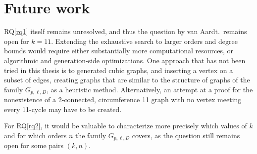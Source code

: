 \section{Future work}
RQ\ref{rq1} itself remains unresolved, and thus the question by van Aardt.\ remains open for $k=11$. Extending the exhaustive search to larger orders and degree bounds would require either substantially more computational resources, or algorithmic and generation-side optimizations. One approach that has not been tried in this thesis is to generated cubic graphs, and inserting a vertex on a subset of edges, creating graphs that are similar to the structure of graphs of the family $G_{p,\ell,D}$, as a heuristic method. Alternatively, an attempt at a proof for the nonexistence of a 2-connected, circumference 11 graph with no vertex meeting every 11-cycle may have to be created.

For RQ\ref{rq2}, it would be valuable to characterize more precisely which values of $k$ and for which orders $n$ the family $G_{p,\ell,D}$ covers, as the question still remains open for some pairs $(k,n)$.
